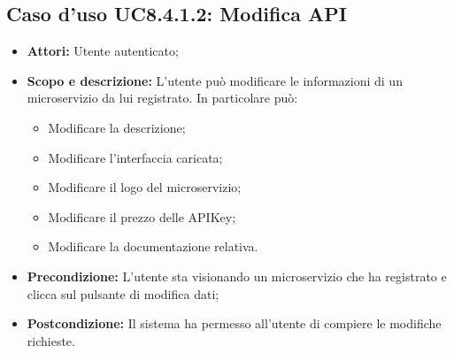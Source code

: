\documentclass[12pt,a4paper,titlepage]{article}
\begin{document}
\subsection{Caso d'uso UC8.4.1.2: Modifica API}
\begin{itemize}
	\item \textbf{Attori: }Utente autenticato;
	\item \textbf{Scopo e descrizione: }L'utente può modificare le informazioni di un microservizio da lui registrato. In particolare può:
	\begin{itemize}
		\item Modificare la descrizione;
		\item Modificare l'interfaccia caricata;
		\item Modificare il logo del microservizio;
		\item Modificare il prezzo delle APIKey;
		\item Modificare la documentazione relativa.
	\end{itemize}
	\item \textbf{Precondizione: }L'utente sta visionando un microservizio che ha registrato e clicca sul pulsante di modifica dati;
	\item \textbf{Postcondizione: }Il sistema ha permesso all'utente di compiere le modifiche richieste.
\end{itemize}
\end{document}
